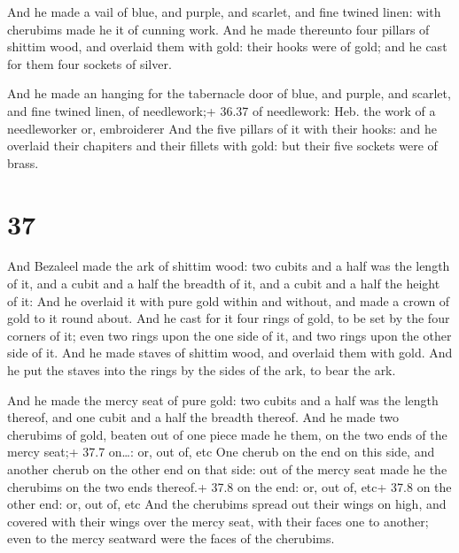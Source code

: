  And he made a vail of blue, and purple, and scarlet, and
fine twined linen: with cherubims made he it of cunning work.
 And he made thereunto four pillars of shittim wood, and
overlaid them with gold: their hooks were of gold; and he cast for them
four sockets of silver.

 And he made an hanging for the tabernacle door of blue,
and purple, and scarlet, and fine twined linen, of needlework;+ 36.37 of
needlework: Heb. the work of a needleworker or, embroiderer
 And the five pillars of it with their hooks: and he
overlaid their chapiters and their fillets with gold: but their five
sockets were of brass.

\hypertarget{section-36}{%
\section{37}\label{section-36}}

 And Bezaleel made the ark of shittim wood: two cubits and a
half was the length of it, and a cubit and a half the breadth of it, and
a cubit and a half the height of it:  And he overlaid it
with pure gold within and without, and made a crown of gold to it round
about.  And he cast for it four rings of gold, to be set by
the four corners of it; even two rings upon the one side of it, and two
rings upon the other side of it.  And he made staves of
shittim wood, and overlaid them with gold.  And he put the
staves into the rings by the sides of the ark, to bear the ark.

 And he made the mercy seat of pure gold: two cubits and a
half was the length thereof, and one cubit and a half the breadth
thereof.  And he made two cherubims of gold, beaten out of
one piece made he them, on the two ends of the mercy seat;+ 37.7
on\ldots: or, out of, etc  One cherub on the end on this
side, and another cherub on the other end on that side: out of the mercy
seat made he the cherubims on the two ends thereof.+ 37.8 on the end:
or, out of, etc+ 37.8 on the other end: or, out of, etc  And
the cherubims spread out their wings on high, and covered with their
wings over the mercy seat, with their faces one to another; even to the
mercy seatward were the faces of the cherubims.

